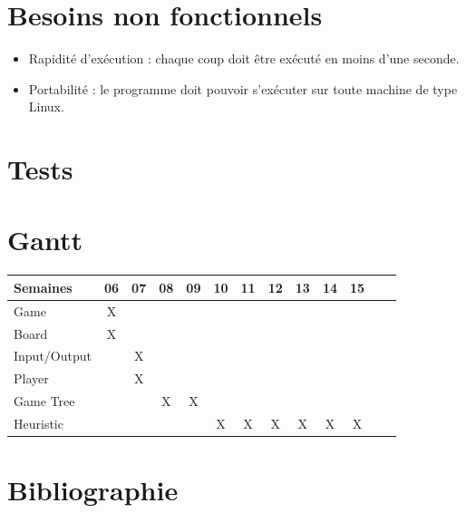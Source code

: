 \documentclass[10pt,a4paper]{article}
\begin{document}
\section{Besoins non fonctionnels}
\label{seq:besoins_non_fonctionnels}
\begin{itemize} 
\item Rapidité d'exécution : chaque coup doit être exécuté en moins d'une seconde.
\item Portabilité : le programme doit pouvoir s'exécuter sur toute machine de type Linux.
\end{itemize}

\section{Tests}
\label{seq:tests}



\section{Gantt}

\begin{center}
\begin{tabular}{| l | c | c | c | c | c | c | c | c | c | c | c | c |}
\hline
Semaines     & 06 & 07 & 08 & 09 & 10 & 11 & 12 & 13 & 14 & 15  \\ \hline
Game         & X  &    &    &    &    &    &    &    &    &     \\ \hline
Board        & X  &    &    &    &    &    &    &    &    &     \\ \hline
Input/Output &    & X  &    &    &    &    &    &    &    &     \\ \hline
Player       &    & X  &    &    &    &    &    &    &    &     \\ \hline
Game Tree    &    &    & X  & X  &    &    &    &    &    &     \\ \hline
Heuristic    &    &    &    &    &  X & X  & X  & X  & X  & X   \\ \hline
\end{tabular}
\end{center}
\newpage

\section{Bibliographie}


{}
\nocite{*}
\end{document}
